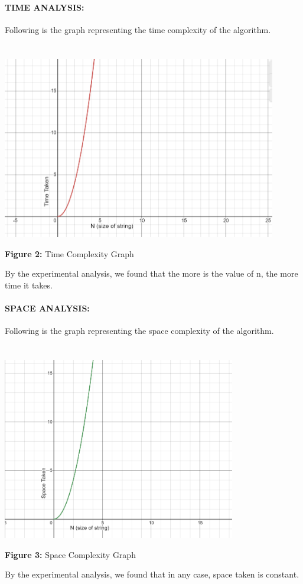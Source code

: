 \documentclass[10pt]{article}
\begin{document}
\begin{multicols*}{2}
\paragraph{TIME ANALYSIS:}Following is the graph representing the time complexity of the algorithm.\\\\\\
\includegraphics[width=\columnwidth, height=8cm]{Time Complexity.png}\begin{center}\textbf{Figure 2:} Time Complexity Graph\end{center}By the experimental analysis, we found that the more is the value of n, the more time it takes.

\paragraph{SPACE ANALYSIS:}Following is the graph representing the space complexity of the algorithm.\\\\\\
\includegraphics[width=\columnwidth, height=8cm]{Space Complexity.png}\begin{center}\textbf{Figure 3:} Space Complexity Graph\end{center}By the experimental analysis, we found that in any case, space taken is constant.


\end{multicols*}
\end{document}

